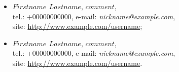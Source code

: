 \documentclass{article}
\begin{document}
\begin{itemize}
    \item {\bf $First name$ $Last name$}, $comment$, \\
    tel.: +$0 000 0000000$, e-mail: \textit{nickname@example.com}, \\
    site: \url{http://www.example.com/username};

    \item {\bf $First name$ $Last name$}, $comment$, \\
    tel.: +$0 000 0000000$, e-mail: \textit{nickname@example.com}, \\
    site: \url{http://www.example.com/username}.
\end{itemize}
\end{document}
